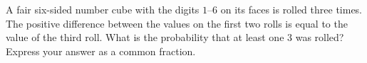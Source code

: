 A fair six-sided number cube with the digits $1$--$6$ on its faces is rolled three times. The positive difference between the values on the first two rolls is equal to the value of the third roll. What is the probability that at least one $3$ was rolled? Express your answer as a common fraction.
